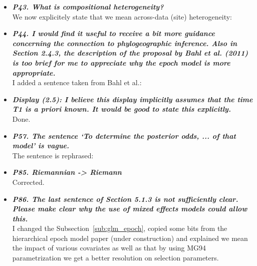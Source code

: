 \documentclass[english]{article}
\begin{document}
\begin{itemize}
\item {
{\it
\textbf{
P43. What is compositional heterogeneity?
}%
}%
}%
\\
We now explicitely state that we mean across-data (site) heterogeneity:

\begin{quote}
\myeditsvfifteen
\end{quote}


\item {
{\it
\textbf{
P44. I would find it useful to receive a bit more guidance concerning the connection to phylogeographic inference. 
Also in Section 2.4.3, the description of the proposal by Bahl et al. (2011) is too brief for me to appreciate why the epoch model is more appropriate.
}%
}%
}%
\\
I added a sentence taken from Bahl et al.:

\begin{quote}
\myeditsvsixteen
\end{quote}

\item {
{\it
\textbf{
Display (2.5): I believe this display implicitly assumes that the time T1 is a priori known. 
It would be good to state this explicitly.
}%
}%
}%
\\
Done.


\item {
{\it
\textbf{
P57. The sentence `To determine the posterior odds, ... of that model' is vague.
}%
}%
}%
\\
The sentence is rephrased:

\begin{quote}
\myeditsveighteen
\end{quote}


\item {
{\it
\textbf{
P85. Riemannian -> Riemann
}%
}%
}%
\\
Corrected.


\item {
{\it
\textbf{
P86. The last sentence of Section 5.1.3 is not sufficiently clear. 
Please make clear why the use of mixed effects models could allow this.
}%
}%
}%
\\
I changed the Subsection~\ref{sub:glm_epoch}, copied some bits from the hierarchical epoch model paper (under construction) and explained we mean the impact of various covariates as well as that by using MG94 parametrization we get a better resolution on selection parameters.




\end{itemize}
\end{document}
